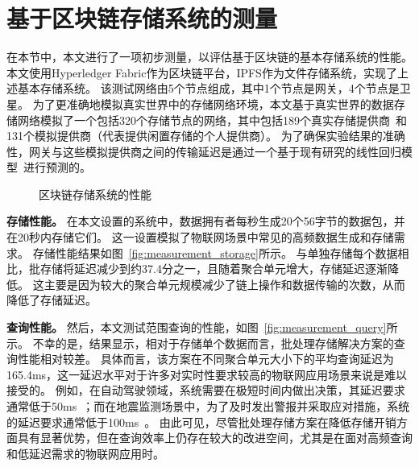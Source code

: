 \section{基于区块链存储系统的测量}
在本节中，本文进行了一项初步测量，以评估基于区块链的基本存储系统的性能。
本文使用Hyperledger Fabric作为区块链平台，IPFS作为文件存储系统，实现了上述基本存储系统。
该测试网络由5个节点组成，其中1个节点是网关，4个节点是卫星。
为了更准确地模拟真实世界中的存储网络环境，本文基于真实世界的数据存储网络模拟了一个包括320个存储节点的网络，其中包括189个真实存储提供商~\cite{corneo2021surrounded}和131个模拟提供商（代表提供闲置存储的个人提供商）。
为了确保实验结果的准确性，网关与这些模拟提供商之间的传输延迟是通过一个基于现有研究的线性回归模型~\cite{ziviani2005improving}进行预测的。
\begin{figure*}[t]
    \centering
    \begin{minipage}{1\linewidth}
	    \centering
        \hfill
        \caption{区块链存储系统的性能} 
    \end{minipage}
\end{figure*}

\textbf{存储性能。}
在本文设置的系统中，数据拥有者每秒生成20个56字节的数据包，并在20秒内存储它们。
这一设置模拟了物联网场景中常见的高频数据生成和存储需求。
存储性能结果如图~\autoref{fig:measurement_storage}所示。
与单独存储每个数据相比，批存储将延迟减少到约37.4分之一，且随着聚合单元增大，存储延迟逐渐降低。
这主要是因为较大的聚合单元规模减少了链上操作和数据传输的次数，从而降低了存储延迟。

\textbf{查询性能。}
然后，本文测试范围查询的性能，如图~\autoref{fig:measurement_query}所示。
不幸的是，结果显示，相对于存储单个数据而言，批处理存储解决方案的查询性能相对较差。
具体而言，该方案在不同聚合单元大小下的平均查询延迟为165.4ms，这一延迟水平对于许多对实时性要求较高的物联网应用场景来说是难以接受的。
例如，在自动驾驶领域，系统需要在极短时间内做出决策，其延迟要求通常低于50ms~\cite{caesar2020nuscenes}；而在地震监测场景中，为了及时发出警报并采取应对措施，系统的延迟要求通常低于100ms~\cite{bhatia2023artificial}。
由此可见，尽管批处理存储方案在降低存储开销方面具有显著优势，但在查询效率上仍存在较大的改进空间，尤其是在面对高频查询和低延迟需求的物联网应用时。


